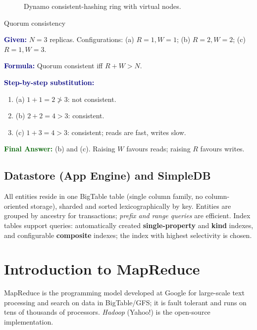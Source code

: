 \documentclass[11pt,a4paper,openany]{report}
\newcommand{\Given}{\par\textbf{\textcolor{navy}{Given:}} }
\newcommand{\Formula}{\par\textbf{\textcolor{navy}{Formula:}} }
\newcommand{\Steps}{\par\textbf{\textcolor{navy}{Step-by-step substitution:}}\par}
\newcommand{\Answer}{\par\textbf{\textcolor{darkgreen}{Final Answer:}} }
\begin{document}
\begin{figure}[H]
\centering
{}
\caption{Dynamo consistent-hashing ring with virtual nodes.}
\end{figure}

\begin{solved}{Quorum consistency}
\Given $N = 3$ replicas. Configurations: (a) $R=1, W=1$; (b) $R=2, W=2$; (c) $R=1, W=3$.
\Formula Quorum consistent iff $R + W > N$.
\Steps
\begin{enumerate}[leftmargin=*]
  \item (a) $1 + 1 = 2 \not> 3$: not consistent.
  \item (b) $2 + 2 = 4 > 3$: consistent.
  \item (c) $1 + 3 = 4 > 3$: consistent; reads are fast, writes slow.
\end{enumerate}
\Answer (b) and (c). Raising $W$ favours reads; raising $R$ favours writes.
\end{solved}

\subsection{Datastore (App Engine) and SimpleDB}
All entities reside in one BigTable table (single column family, no column-oriented storage), sharded and sorted lexicographically by
key. Entities are grouped by ancestry for transactions; \emph{prefix and range queries} are efficient. Index tables support queries:
automatically created \textbf{single-property} and \textbf{kind} indexes, and configurable \textbf{composite} indexes; the index
with highest selectivity is chosen.

\section{Introduction to MapReduce}
MapReduce is the programming model developed at Google for large-scale text processing and search on data in BigTable/GFS; it is
fault tolerant and runs on tens of thousands of processors. \emph{Hadoop} (Yahoo!) is the open-source implementation.
\end{document}
